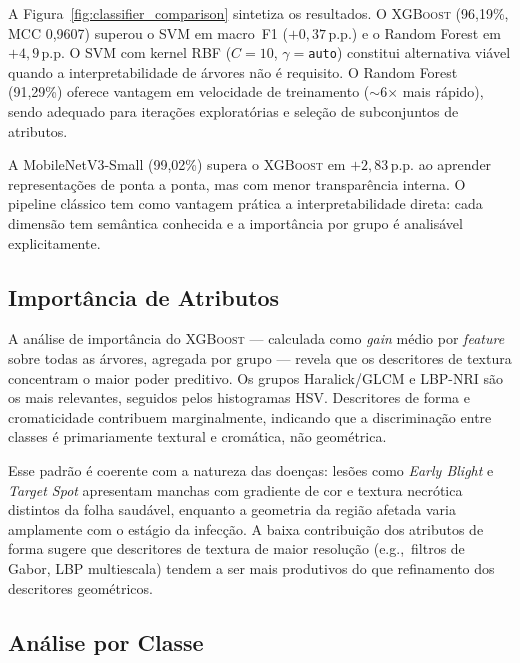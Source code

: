 \documentclass[kdmile,a4paper]{kdmile}
\providecommand{\gls}[1]{\textnormal{\textsc{#1}}}
\begin{document}
A Figura~\ref{fig:classifier_comparison} sintetiza os resultados. O
\gls{XGBoost} (96,19\%, MCC 0,9607) superou o SVM em macro~F1
($+0{,}37$\,p.p.) e o Random Forest em $+4{,}9$\,p.p. O SVM com kernel RBF
($C=10$, $\gamma=$\texttt{auto}) constitui alternativa viável quando a
interpretabilidade de árvores não é requisito. O Random Forest (91,29\%) oferece
vantagem em velocidade de treinamento ($\sim$6$\times$ mais rápido), sendo
adequado para iterações exploratórias e seleção de subconjuntos de atributos.

A MobileNetV3-Small (99,02\%) supera o \gls{XGBoost} em $+2{,}83$\,p.p. ao
aprender representações de ponta a ponta, mas com menor transparência interna.
O pipeline clássico tem como vantagem prática a interpretabilidade direta: cada
dimensão tem semântica conhecida e a importância por grupo é analisável
explicitamente.

\subsection{Importância de Atributos}

A análise de importância do \gls{XGBoost} --- calculada como \textit{gain}
médio por \textit{feature} sobre todas as árvores, agregada por grupo --- revela
que os descritores de textura concentram o maior poder preditivo. Os grupos
Haralick/\gls{GLCM} e LBP-NRI são os mais relevantes, seguidos pelos
histogramas \gls{HSV}. Descritores de forma e cromaticidade contribuem
marginalmente, indicando que a discriminação entre classes é primariamente
textural e cromática, não geométrica.

Esse padrão é coerente com a natureza das doenças: lesões como \textit{Early
Blight} e \textit{Target Spot} apresentam manchas com gradiente de cor e
textura necrótica distintos da folha saudável, enquanto a geometria da região
afetada varia amplamente com o estágio da infecção. A baixa contribuição dos
atributos de forma sugere que descritores de textura de maior resolução
(e.g.,\ filtros de Gabor, LBP multiescala) tendem a ser mais produtivos do
que refinamento dos descritores geométricos.


\subsection{Análise por Classe}
\end{document}
